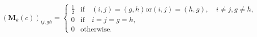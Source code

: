 \begin{equation}
	\left(
	\mathbf{M}_{k}
	\left(
	c
	\right)
	\right)_{ij, gh}
	=
	\begin{cases}
		\frac{1}{2}
		  &   
		\text{if}
		\quad
		\left( i, j \right) = \left( g, h \right)
		\text{or}
		\left( i, j \right) = \left( h, g \right),
		\quad
		i \neq j
		,
		g \neq h, \\
		0
		  &   
		\text{if}
		\quad
		i = j = g = h
	    ,
		\\
		0
		  &   
		\text{otherwise}
		.
	\end{cases}
	\label{eq:linearAlgebra-mcap-cor}
\end{equation}
